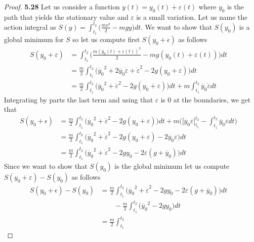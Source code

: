\documentclass[11pt]{article}
\theoremstyle{definition}
\begin{document}
\cleardoublepage
\begin{proof}{\textbf{5.28}}
    Let us consider a function
    $y(t) = y_0(t) + \varepsilon(t)$ where $y_0$
    is the path that yields the stationary value and $\varepsilon$ is a small
    variation. Let us name the action integral as
    $S(y) = \int_{t_1}^{t_2} \big(\frac{mv^2}{2} - mgy\big)dt$. We want
    to show that $S(y_0)$ is a global minimum for $S$ so let us compute first
    $S(y_0 + \epsilon)$ as follows
    \begin{align*}
        S(y_0 + \varepsilon) 
        &= \int_{t_1}^{t_2} \bigg(\frac{m(\dot{y_0}(t) + \dot{\varepsilon}(t))^2}{2}
        - mg(y_0(t) + \varepsilon(t))\bigg)dt\\
        &= \frac{m}{2}\int_{t_1}^{t_2}
        \bigg(\dot{y_0}^2 + 2\dot{y_0}\dot{\varepsilon} +\dot{\varepsilon}^2
        - 2g(y_0 + \varepsilon)\bigg)dt\\
        &= \frac{m}{2}\int_{t_1}^{t_2}
        \bigg(\dot{y_0}^2 +\dot{\varepsilon}^2 - 2g(y_0 + \varepsilon)\bigg)dt
        + m\int_{t_1}^{t_2} \dot{y_0}\dot{\varepsilon} dt
    \end{align*}
    Integrating by parts the last term and using that $\varepsilon$ is $0$ 
    at the boundaries, we get that
    \begin{align*}
        S(y_0 + \epsilon)
        &= \frac{m}{2}\int_{t_1}^{t_2}
        \bigg(\dot{y_0}^2 +\dot{\varepsilon}^2 - 2g(y_0 + \varepsilon)\bigg)dt
        + m\bigg(\bigg[\dot{y_0}\varepsilon\bigg]_{t_1}^{t_2} -
        \int_{t_1}^{t_2} \ddot{y_0}\varepsilon dt\bigg)\\
        &= \frac{m}{2}\int_{t_1}^{t_2}
        \bigg(\dot{y_0}^2 +\dot{\varepsilon}^2 - 2g(y_0 + \varepsilon)
        - 2\ddot{y_0}\varepsilon\bigg)dt\\
        &= \frac{m}{2}\int_{t_1}^{t_2}
        \bigg(\dot{y_0}^2 +\dot{\varepsilon}^2 - 2gy_0 - 2\varepsilon(
        g + \ddot{y_0})\bigg)dt
    \end{align*}
    Since we want to show that $S(y_0)$ is the global minimum let us compute
    $S(y_0 + \varepsilon) - S(y_0)$ as follows
    \begin{align*}
        S(y_0 + \epsilon) - S(y_0)
        &= \frac{m}{2}\int_{t_1}^{t_2}
        \bigg(\dot{y_0}^2 +\dot{\varepsilon}^2 - 2gy_0 - 2\varepsilon(
        g + \ddot{y_0})\bigg)dt\\
        &\quad\quad- \frac{m}{2}\int_{t_1}^{t_2}
        \bigg(\dot{y_0}^2 - 2gy_0\bigg)dt\\
        &= \frac{m}{2}\int_{t_1}^{t_2}

\end{align*}
\end{proof}
\end{document}
